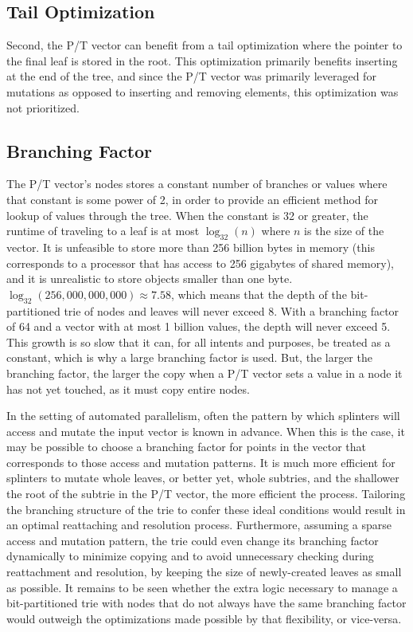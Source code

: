 \subsection{Tail Optimization}
Second, the P/T vector can benefit from a tail optimization where the pointer to
the final leaf is stored in the root. This optimization primarily benefits
inserting at the end of the tree, and since the P/T vector was primarily
leveraged for mutations as opposed to inserting and removing elements, this
optimization was not prioritized.

\subsection{Branching Factor}
The P/T vector's nodes stores a constant number of branches or values where that
constant is some power of 2, in order to provide an efficient method for lookup
of values through the tree. When the constant is 32 or greater, the runtime of
traveling to a leaf is at most $\log_{32}(n)$ where $n$ is the size of the
vector. It is unfeasible to store more than 256 billion bytes in memory (this
corresponds to a processor that has access to 256 gigabytes of shared memory),
and it is unrealistic to store objects smaller than one byte.
$\log_{32}(256,000,000,000) \approx 7.58$, which means that the depth of the
bit-partitioned trie of nodes and leaves will never exceed 8. With a branching
factor of 64 and a vector with at most 1 billion values, the depth will never
exceed 5. This growth is so slow that it can, for all intents and purposes, be
treated as a constant, which is why a large branching factor is used. But, the
larger the branching factor, the larger the copy when a P/T vector sets a value
in a node it has not yet touched, as it must copy entire nodes.

In the setting of automated parallelism, often the pattern by which splinters
will access and mutate the input vector is known in advance. When this is the
case, it may be possible to choose a branching factor for points in the vector
that corresponds to those access and mutation patterns. It is much more
efficient for splinters to mutate whole leaves, or better yet, whole subtries,
and the shallower the root of the subtrie in the P/T vector, the more efficient
the process. Tailoring the branching structure of the trie to confer these ideal
conditions would result in an optimal reattaching and resolution process.
Furthermore, assuming a sparse access and mutation pattern, the trie could even
change its branching factor dynamically to minimize copying and to avoid
unnecessary checking during reattachment and resolution, by keeping the size of
newly-created leaves as small as possible. It remains to be seen whether the extra
logic necessary to manage a bit-partitioned trie with nodes that do not always
have the same branching factor would outweigh the optimizations made possible by
that flexibility, or vice-versa.

